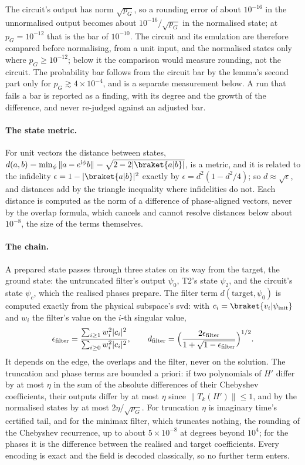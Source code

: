 The circuit's output has norm $\sqrt{p_G}$, so a rounding error of about $10^{-16}$ in the unnormalised output becomes about $10^{-16}/\sqrt{p_G}$ in the normalised state; at $p_G=10^{-12}$ that is the bar of $10^{-10}$. The circuit and its emulation are therefore compared before normalising, from a unit input, and the normalised states only where $p_G\ge10^{-12}$; below it the comparison would measure rounding, not the circuit. The probability bar follows from the circuit bar by the lemma's second part only for $p_G\gtrsim4\times10^{-4}$, and is a separate measurement below. A run that fails a bar is reported as a finding, with its degree and the growth of the difference, and never re-judged against an adjusted bar.

\paragraph{The state metric.} For unit vectors the distance between states, $d(a,b)=\min_\phi\|a-e^{\mathrm{i}\phi}b\|=\sqrt{2-2|\braket{a|b}|}$, is a metric, and it is related to the infidelity $\epsilon=1-|\braket{a|b}|^2$ exactly by $\epsilon=d^2(1-d^2/4)$; so $d\approx\sqrt\epsilon$, and distances add by the triangle inequality where infidelities do not. Each distance is computed as the norm of a difference of phase-aligned vectors, never by the overlap formula, which cancels and cannot resolve distances below about $10^{-8}$, the size of the terms themselves.

\paragraph{The chain.} A prepared state passes through three states on its way from the target, the ground state: the untruncated filter's output $\psi_0$, T2's state $\psi_2$, and the circuit's state $\psi_c$, which the realised phases prepare. The filter term $d(\text{target},\psi_0)$ is computed exactly from the physical subspace's \gls{svd}: with $c_i=\braket{v_i|\psi_{\mathrm{init}}}$ and $w_i$ the filter's value on the $i$-th singular value,
\begin{equation*}
    \epsilon_{\mathrm{filter}}=\frac{\sum_{i\ge1}w_i^2|c_i|^2}{\sum_{i\ge0}w_i^2|c_i|^2},
    \qquad
    d_{\mathrm{filter}}=\Bigl(\frac{2\epsilon_{\mathrm{filter}}}{1+\sqrt{1-\epsilon_{\mathrm{filter}}}}\Bigr)^{1/2}.
\end{equation*}
It depends on the edge, the overlaps and the filter, never on the solution. The truncation and phase terms are bounded a priori: if two polynomials of $H'$ differ by at most $\eta$ in the sum of the absolute differences of their Chebyshev coefficients, their outputs differ by at most $\eta$ since $\|T_k(H')\|\le1$, and by  the normalised states by at most $2\eta/\sqrt{p_G}$. For truncation $\eta$ is imaginary time's certified tail, and for the minimax filter, which truncates nothing, the rounding of the Chebyshev recurrence, up to about $5\times10^{-8}$ at degrees beyond $10^4$; for the phases it is the difference between the realised and target coefficients. Every encoding is exact and the field is decoded classically, so no further term enters.

